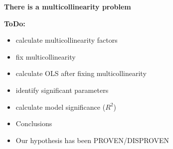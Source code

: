 \textbf{There is a multicollinearity problem}

\textbf{ToDo:}
\begin{itemize}
    \item calculate multicollinearity factors
    \item fix multicollinearity
    \item calculate OLS after fixing multicollinearity
    \item identify significant parameters
    \item calculate model significance ($R^2$)
    \item Conclusions
    \item Our hypothesis has been PROVEN/DISPROVEN
\end{itemize}
